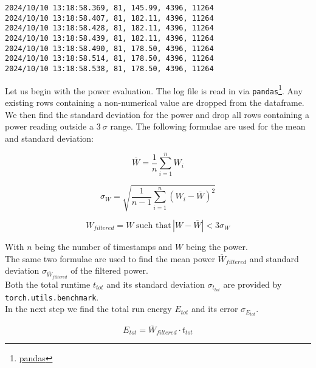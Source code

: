 \begin{verbatim}
2024/10/10 13:18:58.369, 81, 145.99, 4396, 11264
2024/10/10 13:18:58.407, 81, 182.11, 4396, 11264
2024/10/10 13:18:58.428, 81, 182.11, 4396, 11264
2024/10/10 13:18:58.439, 81, 182.11, 4396, 11264
2024/10/10 13:18:58.490, 81, 178.50, 4396, 11264
2024/10/10 13:18:58.514, 81, 178.50, 4396, 11264
2024/10/10 13:18:58.538, 81, 178.50, 4396, 11264
\end{verbatim}

Let us begin with the power evaluation. The log file is read in via \texttt{pandas}\footnote{\href{https://pandas.pydata.org/}{pandas}}. Any existing rows containing a non-numerical value are dropped from the dataframe. We then find the standard deviation for the power and drop all rows containing a power reading outside a $3 \: \sigma $ range. The following formulae are used for the mean and standard deviation:

\begin{equation}
\overline{W} = \frac{1}{n} \sum_{i=1}^{n} W_i
\end{equation}

\begin{equation}
\sigma_W = \sqrt{\frac{1}{n - 1} \sum_{i=1}^{n} (W_i - \overline{W})^2}
\end{equation}

\begin{equation}
W_{filtered} = W \; \text{such that} \, |W - \overline{W}| < 3 \sigma_W
\end{equation}
    
With \( n \) being the number of timestamps and \( W \) being the power. \\
The same two formulae are used to find the mean power \( \overline{W}_{filtered} \) and standard deviation \( \sigma_{\overline{W}_{filtered}} \) of the filtered power. \\
Both the total runtime \(t_{tot}\) and its standard deviation \(\sigma_{t_{tot}} \) are provided by \texttt{torch.utils.benchmark}.\\
In the next step we find the total run energy \( E_{tot} \) and its error \( \sigma_{E_{tot}} \).

\begin{equation}
E_{tot} = \overline{W}_{filtered} \cdot t_{tot}
\end{equation}

